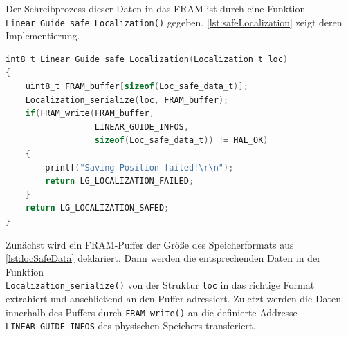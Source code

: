 \noindent
Der Schreibprozess dieser Daten in das FRAM ist durch eine Funktion \\\verb|Linear_Guide_safe_Localization()| gegeben. \autoref{lst:safeLocalization} zeigt deren Implementierung.
\begin{lstlisting}[language=C, caption={FRAM Speichervorgang}, label={lst:safeLocalization}]
int8_t Linear_Guide_safe_Localization(Localization_t loc)
{
	uint8_t FRAM_buffer[sizeof(Loc_safe_data_t)];
	Localization_serialize(loc, FRAM_buffer);
	if(FRAM_write(FRAM_buffer, 
	              LINEAR_GUIDE_INFOS, 
	              sizeof(Loc_safe_data_t)) != HAL_OK)
	{
		printf("Saving Position failed!\r\n");
		return LG_LOCALIZATION_FAILED;
	}
	return LG_LOCALIZATION_SAFED;
}
\end{lstlisting}
Zunächst wird ein FRAM-Puffer der Größe des Speicherformats aus \autoref{lst:locSafeData} deklariert. Dann werden die entsprechenden Daten in der Funktion\\ \verb|Localization_serialize()| von der Struktur \verb|loc| in das richtige Format extrahiert und anschließend an den Puffer adressiert. Zuletzt werden die Daten innerhalb des Puffers durch \verb|FRAM_write()| an die definierte Addresse\\ \verb|LINEAR_GUIDE_INFOS| des physischen Speichers transferiert.\\

